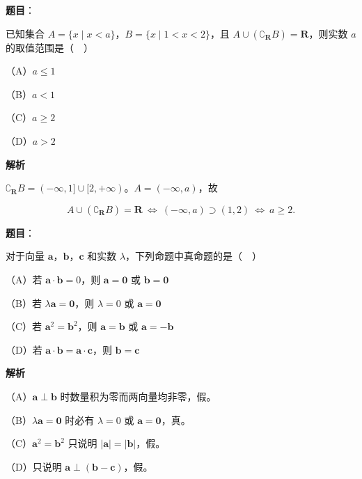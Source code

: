 \begin{answer}

\textbf{题目}：

已知集合 $A=\{x\mid x<a\}$，$B=\{x\mid 1<x<2\}$，且 $A\cup(\complement_{\mathbf R}B)=\mathbf R$，则实数 $a$ 的取值范围是（　）

（A）$a\leqslant1$

（B）$a<1$

（C）$a\geqslant2$

（D）$a>2$

\textbf{解析}

$\complement_{\mathbf R}B=(-\infty,1]\cup[2,+\infty)$。$A=(-\infty,a)$，故

\nopagebreak[4]
\[A\cup(\complement_{\mathbf R}B)=\mathbf R\ \Longleftrightarrow\ (-\infty,a)\supset(1,2)\ \Longleftrightarrow\ a\geqslant2.\]


\end{answer}
\begin{answer}

\textbf{题目}：

对于向量 $\boldsymbol a$，$\boldsymbol b$，$\boldsymbol c$ 和实数 $\lambda$，下列命题中真命题的是（　）

（A）若 $\boldsymbol a\cdot\boldsymbol b=0$，则 $\boldsymbol a=\boldsymbol 0$ 或 $\boldsymbol b=\boldsymbol 0$

（B）若 $\lambda\boldsymbol a=\boldsymbol 0$，则 $\lambda=0$ 或 $\boldsymbol a=\boldsymbol 0$

（C）若 $\boldsymbol a^2=\boldsymbol b^2$，则 $\boldsymbol a=\boldsymbol b$ 或 $\boldsymbol a=-\boldsymbol b$

（D）若 $\boldsymbol a\cdot\boldsymbol b=\boldsymbol a\cdot\boldsymbol c$，则 $\boldsymbol b=\boldsymbol c$

\textbf{解析}

（A）$\boldsymbol a\perp\boldsymbol b$ 时数量积为零而两向量均非零，假。

（B）$\lambda\boldsymbol a=\boldsymbol 0$ 时必有 $\lambda=0$ 或 $\boldsymbol a=\boldsymbol 0$，真。

（C）$\boldsymbol a^2=\boldsymbol b^2$ 只说明 $|\boldsymbol a|=|\boldsymbol b|$，假。

（D）只说明 $\boldsymbol a\perp(\boldsymbol b-\boldsymbol c)$，假。


\end{answer}
